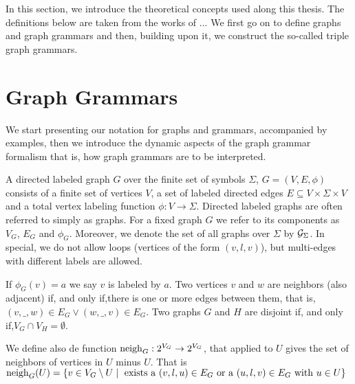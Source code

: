 
In this section, we introduce the theoretical concepts used along this thesis. The definitions below are taken from the works of ...%
We first go on to define graphs and graph grammars and then, building upon it, we construct the so-called triple graph grammars.

\section{Graph Grammars}
We start presenting our notation for graphs and grammars, accompanied by examples, then we introduce the dynamic aspects of the graph grammar formalism that is, how graph grammars are to be interpreted.


\begin{definition}
	\label{def:graph}
	A directed labeled graph $G$ over the finite set of symbols $\Sigma$, $G = (V, E, \phi)$ consists of a finite set of vertices $V$, a set of labeled directed edges $E \subseteq V \times \Sigma \times V$ and a total vertex labeling function $\phi : V \to \Sigma$. Directed labeled graphs are often referred to simply as graphs. For a fixed graph $G$ we refer to its components as $V_G$, $E_G$ and $\phi_G$. Moreover, we denote the set of all graphs over $\Sigma$ by $\mathcal{G}_{\Sigma}$. In special, we do not allow loops (vertices of the form $(v,l,v)$), but multi-edges with different labels are allowed.
	
	If $\phi_G(v) = a$ we say $v$ is labeled by $a$. Two vertices $v$ and $w$ are neighbors (also adjacent) if, and only if,there is one or more edges between them, that is, $(v,\_,w) \in E_G \lor (w,\_,v) \in E_G$. Two graphs $G$ and $H$ are disjoint if, and only if,$V_G \cap V_H = \emptyset$.
	
	We define also de function $\operatorname{neigh}_{G}: 2^{V_G} \to 2^{V_G}$, that applied to $U$ gives the set of neighbors of vertices in $U$ minus $U$. That is $\operatorname{neigh}_{G}(U) = \{ v \in V_G \setminus U \; | \; \text{ exists a } (v,l,u) \in E_G \text{ or a } (u,l,v) \in E_G \text{ with } u \in U \}$
\end{definition}

